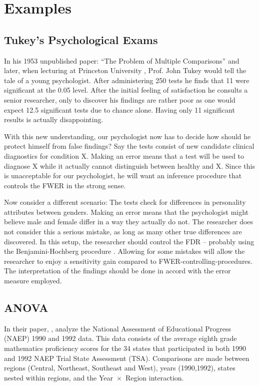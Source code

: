 \documentclass[review,12pt]{article}
\begin{document}
\section{\label{sec:examples}Examples}




\subsection{Tukey's Psychological Exams}
In his 1953 unpublished paper: ``The Problem of Multiple Comparisons'' \citep{benjamini_john_2002} and later, when lecturing at Princeton University \citep{donoho_higher_2004}, Prof. John Tukey would tell the tale of a young psychologist. After administering 250 tests he finds that 11 were significant at the 0.05 level. After the initial feeling of satisfaction he consults a senior researcher, only to discover his findings are rather poor as one  would expect 12.5 significant tests due to chance alone. Having only 11 significant results is actually disappointing.


With this new understanding, our psychologist now has to decide how should he protect himself from false findings? 
Say the tests consist of new candidate clinical diagnostics for condition X. Making an error means that a test will be used to diagnose X while it actually cannot distinguish between healthy and X. Since this is unacceptable for our psychologist, he will want an inference procedure that controls the FWER in the strong sense. 


Now consider a different scenario: The tests check for differences in personality attributes between genders. Making an error means that the psychologist might believe male and female differ in a way they actually do not. The researcher does not consider this a serious mistake, as long as many other true differences are discovered. In this setup, the researcher should control the FDR -- probably using the Benjamini-Hochberg procedure \citep{benjamini_controlling_1995}. Allowing for some mistakes will allow the researcher to enjoy a sensitivity gain compared to FWER-controlling-procedures. The interpretation of the findings should be done in accord with the error measure employed.


\subsection{ANOVA}
In their \citeyear{williams_controlling_1999} paper, \citeauthor*{williams_controlling_1999}, analyze the National Assessment of Educational Progress (NAEP) 1990 and 1992 data. This data consists of the average eighth grade mathematics proficiency scores for the 34 states that participated in both 1990 and 1992 NAEP Trial State Assessment (TSA). Comparisons are made between regions (Central, Northeast, Southeast and West), years (1990,1992), states nested within regions, and the Year~$\times$~Region interaction. 
\end{document}
